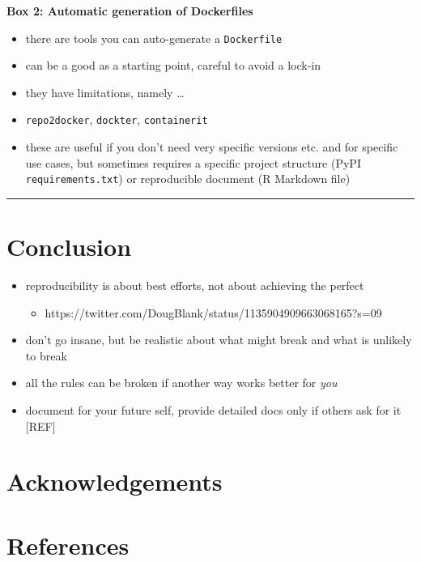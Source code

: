 \documentclass[10pt,letterpaper]{article}
\providecommand{\tightlist}{%
  \setlength{\itemsep}{0pt}\setlength{\parskip}{0pt}}
\begin{document}
\textbf{Box 2: Automatic generation of Dockerfiles}

\begin{itemize}
\tightlist
\item
  there are tools you can auto-generate a \texttt{Dockerfile}
\item
  can be a good as a starting point, careful to avoid a lock-in
\item
  they have limitations, namely \ldots{}
\item
  \texttt{repo2docker}, \texttt{dockter}, \texttt{containerit}
\item
  these are useful if you don't need very specific versions etc. and for
  specific use cases, but sometimes requires a specific project
  structure (PyPI \texttt{requirements.txt}) or reproducible document (R
  Markdown file)
\end{itemize}

\begin{center}\rule{0.5\linewidth}{\linethickness}\end{center}

\hypertarget{conclusion}{%
\section*{Conclusion}\label{conclusion}}

\begin{itemize}
\tightlist
\item
  reproducibility is about best efforts, not about achieving the perfect

  \begin{itemize}
  \tightlist
  \item
    https://twitter.com/DougBlank/status/1135904909663068165?s=09
  \end{itemize}
\item
  don't go insane, but be realistic about what might break and what is
  unlikely to break
\item
  all the rules can be broken if another way works better for \emph{you}
\item
  document for your future self, provide detailed docs only if others
  ask for it {[}REF{]}
\end{itemize}

\hypertarget{acknowledgements}{%
\section*{Acknowledgements}\label{acknowledgements}}

\hypertarget{references}{%
\section*{References}\label{references}}

\nolinenumbers
\end{document}

